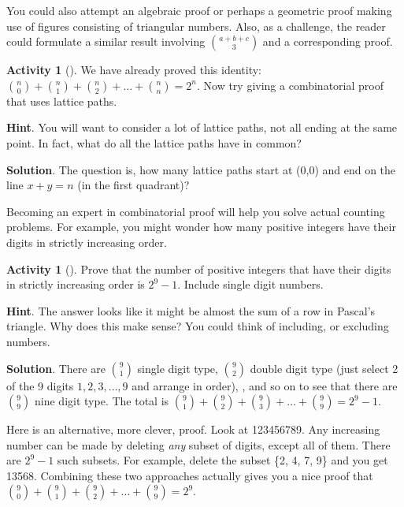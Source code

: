 \documentclass[10pt,]{book}
\theoremstyle{plain}
\theoremstyle{definition}
\theoremstyle{definition}
\theoremstyle{definition}
\newtheorem{activity}[project]{Activity}
\theoremstyle{definition}
\numberwithin{equation}{chapter}
\begin{document}
\hypertarget{p-590}{}%
You could also attempt an algebraic proof or perhaps a geometric proof making use of figures consisting of triangular numbers. Also, as a challenge, the reader could formulate a similar result involving \(\binom{a + b + c}{3}\) and a corresponding proof.%
\begin{activity}[]\label{activity-39}
\hypertarget{p-591}{}%
We have already proved this identity: \(\binom{n}{0} + \binom{n}{1} + \binom{n}{2} + \ldots + \binom{n}{n} = 2^{n}\).  Now try giving a combinatorial proof that uses lattice paths.%
\par\smallskip%
\noindent\textbf{Hint}.\hypertarget{hint-27}{}\quad%
\hypertarget{p-592}{}%
You will want to consider a lot of lattice paths, not all ending at the same point.  In fact, what do all the lattice paths have in common?%
\par\smallskip%
\noindent\textbf{Solution}.\hypertarget{solution-47}{}\quad%
\hypertarget{p-593}{}%
The question is, how many lattice paths start at (0,0) and end on the line \(x+y=n\) (in the first quadrant)?%
\end{activity}
\hypertarget{p-594}{}%
Becoming an expert in combinatorial proof will help you solve actual counting problems.  For example, you might wonder how many positive integers have their digits in strictly increasing order.%
\begin{activity}[]\label{activity-40}
\hypertarget{p-595}{}%
Prove that the number of positive integers that have their digits in strictly increasing order is \(2^{9} - 1\). Include single digit numbers.%
\par\smallskip%
\noindent\textbf{Hint}.\hypertarget{hint-28}{}\quad%
\hypertarget{p-596}{}%
The answer looks like it might be almost the sum of a row in Pascal's triangle.  Why does this make sense?  You could think of including, or excluding numbers.%
\par\smallskip%
\noindent\textbf{Solution}.\hypertarget{solution-48}{}\quad%
\hypertarget{p-597}{}%
There are \(\binom{9}{1}\) single digit type, \(\binom{9}{2}\) double digit type (just select 2 of the 9 digits \(1, 2, 3, \ldots, 9\) and arrange in order), \textellipsis{}, and so on to see that there are \(\binom{9}{9}\) nine digit type. The total is \(\binom{9}{1} + \binom{9}{2} + \binom{9}{3} + \ldots + \binom{9}{9} = 2^{9} - 1\).%
\par
\hypertarget{p-598}{}%
Here is an alternative, more clever, proof. Look at 123456789. Any increasing number can be made by deleting \emph{any} subset of digits, except all of them. There are \(2^{9} - 1\) such subsets. For example, delete the subset \{2, 4, 7, 9\} and you get 13568. Combining these two approaches actually gives you a nice proof that \(\binom{9}{0} + \binom{9}{1} + \binom{9}{2} + \ldots + \binom{9}{9} = 2^{9}\).%
\end{activity}
\end{document}
